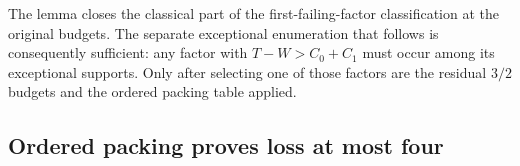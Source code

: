 \documentclass[11pt]{article}
\theoremstyle{remark}\newtheorem{remark}[theorem]{Remark}
\begin{document}
The lemma closes the classical part of the first-failing-factor
classification at the original budgets. The separate exceptional
enumeration that follows is consequently sufficient: any factor with
$T-W>C_0+C_1$ must occur among its exceptional supports. Only after
selecting one of those factors are the residual $3/2$ budgets and
the ordered packing table applied.


\subsection{Ordered packing proves loss at most four}
\end{document}
